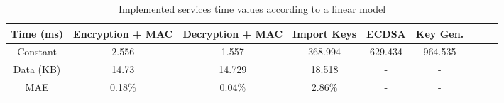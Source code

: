 \begin{table}[h!]
\centering
\def\arraystretch{1.5}
\begin{tabular}{|c|c|c|c|c|c|c|c|c|}
\hline
	Time (ms) & Encryption + MAC & Decryption + MAC & Import Keys & ECDSA & Key Gen. \\ \hline
	Constant  & 2.556  & 1.557   & 368.994 & 629.434 & 964.535 \\ \hline
	Data (KB) & 14.73  & 14.729  & 18.518  & - & - \\ \hline
	MAE	  & 0.18\% & 0.04\%  & 2.86\%  & - & - \\ \hline
\end{tabular}
\caption{Implemented services time values according to a linear model}
\label{tab:services-model}
\end{table}
